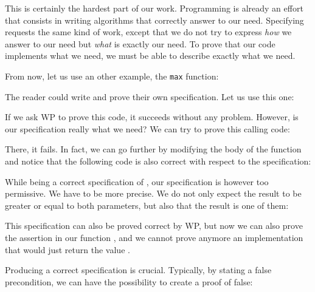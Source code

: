 


This is certainly the hardest part of our work. Programming is already
an effort that consists in writing algorithms that correctly answer to
our need. Specifying requests the same kind of work, except that we do
not try to express \emph{how} we answer to our need but \emph{what} is
exactly our need. To prove that our code implements what we need, we
must be able to describe exactly what we need.

From now, let us use an other example, the \texttt{max} function:






The reader could write and prove their own specification. Let us
use this one:






If we ask WP to prove this code, it succeeds without any problem.
However, is our specification really what we need? We can try to prove this
calling code:






There, it fails. In fact, we can go further by modifying the body of
the  function and notice that the following code is also
correct with respect to the specification:






While being a correct specification of , our specification
is however too permissive. We have to be more precise. We do
not only expect the result to be greater or equal to both parameters,
but also that the result is one of them:





This specification can also be proved correct by WP, but now we can also prove
the assertion in our function , and we cannot prove anymore an
implementation that would just return the value .




Producing a correct specification is crucial. Typically, by stating a
false precondition, we can have the possibility to create a proof of
false:


